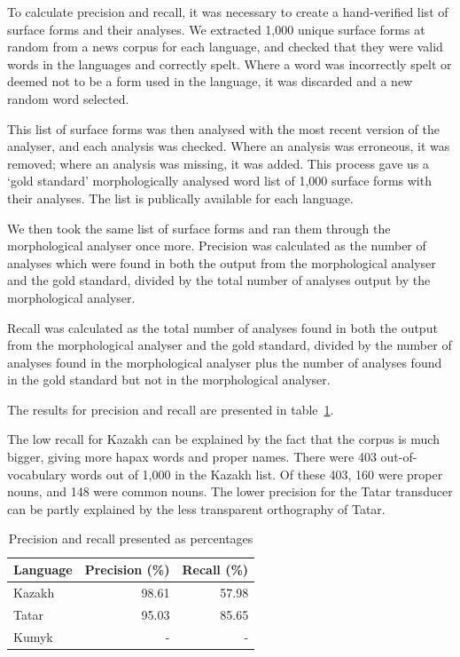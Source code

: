 \documentclass[a4paper,11pt,twocolumn]{article}
\begin{document}
To calculate precision and recall, it was necessary to create a hand-verified list of surface forms and their analyses.  We extracted 1,000 unique surface forms at random from a news corpus for each language, and checked that they were valid words in the languages and correctly spelt.  Where a word was incorrectly spelt or deemed not to be a form used in the language, it was discarded and a new random word selected.

This list of surface forms was then analysed with the most recent version of the analyser, and each analysis was checked.  Where an analysis was erroneous, it was removed; where an analysis was missing, it was added.  This process gave us a `gold standard' morphologically analysed word list of 1,000 surface forms with their analyses.  The list is publically available for each language.%

We then took the same list of surface forms and ran them through the morphological analyser once more.  Precision was calculated as the number of analyses which were found in both the output from the morphological analyser and the gold standard, divided by the total number of analyses output by the morphological analyser.

Recall was calculated as the total number of analyses found in both the output from the morphological analyser and the gold standard, divided by the number of analyses found in the morphological analyser plus the number of analyses found in the gold standard but not in the morphological analyser.

The results for precision and recall are presented in table~\ref{table:precrecall}. 

The low recall for Kazakh can be explained by the fact that the corpus is much bigger, giving 
more hapax words and proper names. There were 403 out-of-vocabulary words out of 1,000 in the Kazakh list.
Of these 403, 160 were proper nouns, and 148 were common nouns. The lower precision for the 
Tatar transducer can be partly explained by the less transparent orthography of Tatar. 



\begin{table}
\begin{center}
	\begin{tabular}{lrr}
	\toprule
		\textbf{Language} & \textbf{Precision (\%)} & \textbf{Recall (\%)} \\
	\midrule
		Kazakh & 98.61 &  57.98 \\
		Tatar & 95.03 & 85.65 \\
		Kumyk & - & - \\
	\bottomrule
	\end{tabular}
	\caption{Precision and recall presented as percentages}
	\label{table:precrecall}
\end{center}
\end{table}
\end{document}
